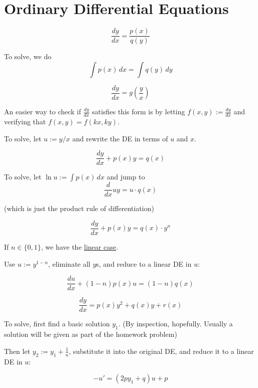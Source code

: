 \section{Ordinary Differential Equations}\label{e598fa6}

\label{e55966b}

\label{c4db619}

$$\frac{dy}{dx}=\frac{p(x)}{q(y)}$$

To solve, we do
$$
  \int p(x)\,dx=\int q(y)\,dy
$$

\label{bb1ee90}

$$\frac{dy}{dx}=g\left(\frac yx\right)$$

An easier way to check if $\displaystyle\frac{dy}{dx}$ satisfies this form is
by letting $f(x,y):=\displaystyle\frac{dy}{dx}$ and verifying that
$f(x,y)=f(kx,ky)$.

To solve, let $u:=y/x$ and rewrite the DE in terms of $u$ and $x$.

\label{b8c7e19}

$$\frac{dy}{dx}+p(x)y=q(x)$$

To solve, let $\ln u:=\int p(x)\,dx$ and jump to
$$
  \frac d{dx}uy=u\cdot q(x)
$$

(which is just the product rule of differentiation)

\label{dc54d9b}

$$\frac{dy}{dx}+p(x)y=q(x)\cdot y^n$$

If $n\in\{0,1\}$, we have the \href{b8c7e19}{linear case}.

Use $u:=y^{1-n}$, eliminate all $y$s, and reduce to a linear DE in $u$:

$$\frac{du}{dx}+(1-n)p(x)u=(1-n)q(x)$$

\label{e5b78d0}

$$\frac{dy}{dx}=p(x)y^2+q(x)y+r(x)$$

To solve, first find a basic solution $y_1$. (By inspection, hopefully. Usually
a solution will be given as part of the homework problem)

Then let $\displaystyle y_2:=y_1+\frac1u$, substitute it into the original DE,
and reduce it to a linear DE in $u$:

$$-u'=(2py_1+q)u+p$$


